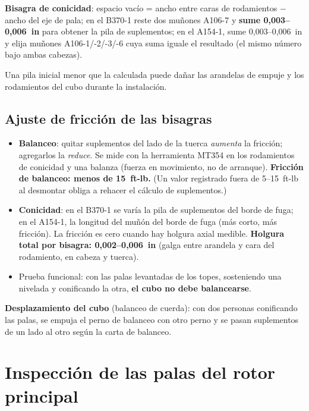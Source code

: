 \textbf{Bisagra de conicidad}: espacio vacío = ancho entre caras de rodamientos $-$ ancho del eje de pala; en el B370-1 reste dos muñones A106-7 y \textbf{sume 0,003--0,006~in} para obtener la pila de suplementos; en el A154-1, sume 0,003--0,006~in y elija muñones A106-1/-2/-3/-6 cuya suma iguale el resultado (el mismo número bajo ambas cabezas).

\begin{precaucion}
Una pila inicial menor que la calculada puede dañar las arandelas de empuje y los rodamientos del cubo durante la instalación.
\end{precaucion}

\subsection{Ajuste de fricción de las bisagras}
\label{sec:friccion-bisagras}

\begin{itemize}
\item \textbf{Balanceo}: quitar suplementos del lado de la tuerca \emph{aumenta} la fricción; agregarlos la \emph{reduce}. Se mide con la herramienta MT354 en los rodamientos de conicidad y una balanza (fuerza en movimiento, no de arranque). \textbf{Fricción de balanceo: menos de 15~ft-lb.} (Un valor registrado fuera de 5--15~ft-lb al desmontar obliga a rehacer el cálculo de suplementos.)
\item \textbf{Conicidad}: en el B370-1 se varía la pila de suplementos del borde de fuga; en el A154-1, la longitud del muñón del borde de fuga (más corto, más fricción). La fricción es cero cuando hay holgura axial medible. \textbf{Holgura total por bisagra: 0,002--0,006~in} (galga entre arandela y cara del rodamiento, en cabeza y tuerca).
\item Prueba funcional: con las palas levantadas de los topes, sosteniendo una nivelada y conificando la otra, \textbf{el cubo no debe balancearse}.
\end{itemize}

\textbf{Desplazamiento del cubo} (balanceo de cuerda): con dos personas conificando las palas, se empuja el perno de balanceo con otro perno y se pasan suplementos de un lado al otro según la carta de balanceo.

\section{Inspección de las palas del rotor principal}

